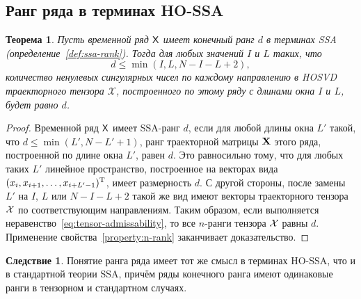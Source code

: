 \documentclass[specialist,
  substylefile=spbu.rtx,
subf,href,colorlinks=true, 12pt]{disser}
\theoremstyle{plain}
\newtheorem{theorem}{Теорема}
\theoremstyle{definition}
\newtheorem*{corollary}{Следствие}
\theoremstyle{remark}
\newtheorem*{remark}{Замечание}
\begin{document}

\subsection{Ранг ряда в терминах HO-SSA}\label{subsec:tensor-ssa-rank}
\begin{theorem}
  \label{state:tens-ssa-rank}
  Пусть временной ряд $\mathsf{X}$ имеет конечный ранг $d$ в терминах \emph{SSA} (определение~\ref{def:ssa-rank}).
  Тогда для любых значений $I$ и $L$ таких, что
  \begin{equation}
    d\leqslant\min(I, L, N-I-L+2), \label{eq:tensor-admissability}
  \end{equation}
  количество ненулевых сингулярных чисел по каждому направлению в \emph{HOSVD} траекторного тензора $\mathcal{X}$,
  построенного по этому ряду с длинами окна $I$ и $L$, будет равно $d$.
\end{theorem}
\begin{proof}
  Временной ряд $\mathsf{X}$ имеет SSA-ранг $d$, если для любой длины окна $L'$ такой, что
  $d \leqslant \min(L', N-L'+1)$,
  ранг траекторной матрицы $\mathbf{X}$ этого ряда, построенной по длине окна $L'$, равен $d$.
  Это равносильно тому, что для любых таких $L'$ линейное пространство, построенное на векторах вида
  $(x_i, x_{i+1}, \ldots, x_{i + L' - 1})^{\mathrm{T}}$, имеет размерность $d$.
  С другой стороны, после замены $L'$ на $I$, $L$ или $N-I-L+2$ такой же вид имеют векторы траекторного тензора $\mathcal{X}$ по соответствующим направлениям.
  Таким образом, если выполняется неравенство~\eqref{eq:tensor-admissability}, то все $n$-ранги тензора
  $\mathcal{X}$ равны $d$.
  Применение свойства~\ref{property:n-rank} заканчивает доказательство.
\end{proof}

\begin{corollary}
  Понятие ранга ряда имеет тот же смысл в терминах HO-SSA, что и в стандартной теории SSA, причём ряды
  конечного ранга имеют одинаковые ранги в тензорном и стандартном случаях.
\end{corollary}
\end{document}
